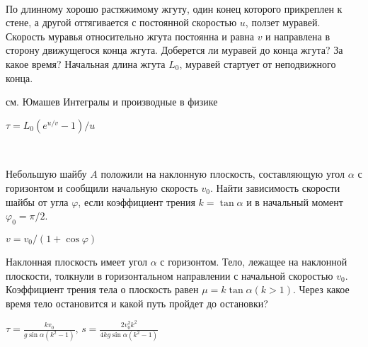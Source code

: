 \begin{ex}
\hspace{0pt} \\
\begin{minipage}{.65\textwidth}
По длинному хорошо растяжимому жгуту, один конец которого прикреплен к стене, а другой оттягивается с постоянной скоростью $u$, ползет муравей. Скорость муравья относительно жгута постоянна и равна $v$ и направлена в сторону движущегося конца жгута. Доберется ли муравей до конца жгута? За какое время? Начальная длина жгута $L_0$, муравей стартует от неподвижного конца.
\end{minipage}
\begin{minipage}{.35\textwidth}
\centering

\end{minipage}
\begin{sol}
см. Юмашев Интегралы и производные в физике
\end{sol}
\begin{ans}
$\tau = L_0(e^{u/v} - 1)/u$
\end{ans}
\end{ex}

\begin{ex}
\hspace{0pt} \\
\begin{minipage}{.65\textwidth}
Небольшую шайбу $A$ положили на наклонную плоскость, составляющую угол $\alpha$ с горизонтом и сообщили начальную скорость $v_0$. Найти зависимость скорости шайбы от угла $\varphi$, если коэффициент трения $k = \tan \alpha$ и в начальный момент $\varphi_0 = \pi/2$.
\end{minipage}
\begin{minipage}{.35\textwidth}
\centering

\end{minipage}
\begin{ans}
$v=v_0/(1+\cos \varphi)$
\end{ans}
\end{ex}

\begin{ex}
Наклонная плоскость имеет угол $\alpha$ с горизонтом. Тело, лежащее на наклонной плоскости, толкнули в горизонтальном направлении с начальной скоростью $v_0$. Коэффициент трения тела о плоскость равен $\mu = k \tan \alpha (k > 1)$. Через какое время тело остановится и какой путь пройдет до остановки?
\begin{ans}
$\tau = \frac{kv_0}{g\sin\alpha(k^2-1)}$, $s = \frac{2v_0^2k^2}{4kg\sin\alpha(k^2-1)}$
\end{ans}
\end{ex}

